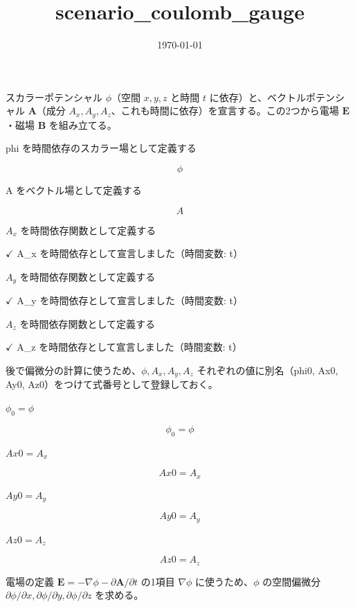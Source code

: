\documentclass[dvipdfmx,a4paper,11pt]{jsarticle}
\title{scenario\_coulomb\_gauge}
\date{\today}
\begin{document}
\maketitle

スカラーポテンシャル $\phi$（空間 $x,y,z$ と時間 $t$ に依存）と、ベクトルポテンシャル $\mathbf A$（成分 $A_x,A_y,A_z$、これも時間に依存）を宣言する。この2つから電場 $\mathbf E$・磁場 $\mathbf B$ を組み立てる。

phi を時間依存のスカラー場として定義する

\[
  \phi
\]

A をベクトル場として定義する

\[
  A
\]

$A_x$ を時間依存関数として定義する

$\checkmark$ A\_x を時間依存として宣言しました（時間変数: t）

$A_y$ を時間依存関数として定義する

$\checkmark$ A\_y を時間依存として宣言しました（時間変数: t）

$A_z$ を時間依存関数として定義する

$\checkmark$ A\_z を時間依存として宣言しました（時間変数: t）

後で偏微分の計算に使うため、$\phi,A_x,A_y,A_z$ それぞれの値に別名（phi0, Ax0, Ay0, Az0）をつけて式番号として登録しておく。

$\phi_{0} = \phi$

\begin{equation}
  \phi_{0} = \phi
  \label{eq:E1}
\end{equation}

$Ax0 = A_x$

\begin{equation}
  Ax0 = A_x
  \label{eq:E2}
\end{equation}

$Ay0 = A_y$

\begin{equation}
  Ay0 = A_y
  \label{eq:E3}
\end{equation}

$Az0 = A_z$

\begin{equation}
  Az0 = A_z
  \label{eq:E4}
\end{equation}

電場の定義 $\mathbf E=-\nabla\phi-\partial\mathbf A/\partial t$ の1項目 $\nabla\phi$ に使うため、$\phi$ の空間偏微分 $\partial\phi/\partial x,\partial\phi/\partial y,\partial\phi/\partial z$ を求める。
\end{document}
